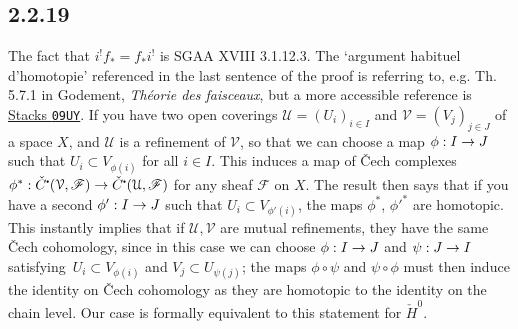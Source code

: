 \documentclass[deligne.tex]{subfiles}
\begin{document}
\subsection*{2.2.19} The fact that $i^!f_*=f_*i^!$ is SGAA XVIII 3.1.12.3.
The `argument habituel d'homotopie' referenced in the last sentence of the
proof is referring to, e.g. Th. 5.7.1 in Godement,
\emph{Théorie des faisceaux}, but a more accessible reference is
\href{https://stacks.math.columbia.edu/tag/09UY}{Stacks \texttt{09UY}}.
If you have two open coverings $\mathcal U=(U_i)_{i\in I}$ and
$\mathcal V=(V_j)_{j\in J}$ of a space $X$, and $\mathcal U$ is a refinement
of $\mathcal V$, so that we can choose a map $\phi:I\rightarrow J$ such that
$U_i\subset V_{\phi(i)}$ for all $i\in I$. This induces a map of \v Cech
complexes
$\phi^*:\check C^\dotp(\mathcal V,\mathscr F)\ra\check C^\dotp(\mathcal U,\mathscr F)$
for any sheaf $\mathscr F$ on $X$.
The result then says that if you have a second $\phi':I\rightarrow J$ such that
$U_i\subset V_{\phi'(i)}$, the maps $\phi^*$, $\phi'^*$ are homotopic.
This instantly implies that if $\mathcal U,\mathcal V$ are mutual 
refinements, they have the same \v Cech cohomology, since in this case we
can choose $\phi:I\rightarrow J$ and $\psi:J\rightarrow I$ satisfying\
$U_i\subset V_{\phi(i)}$ and $V_j\subset U_{\psi(j)}$; the maps
$\phi\circ\psi$ and $\psi\circ\phi$ must then induce the identity on
\v Cech cohomology as they are homotopic to the identity on the chain level.
Our case is formally equivalent to this statement for $\check H^0$.
\end{document}
